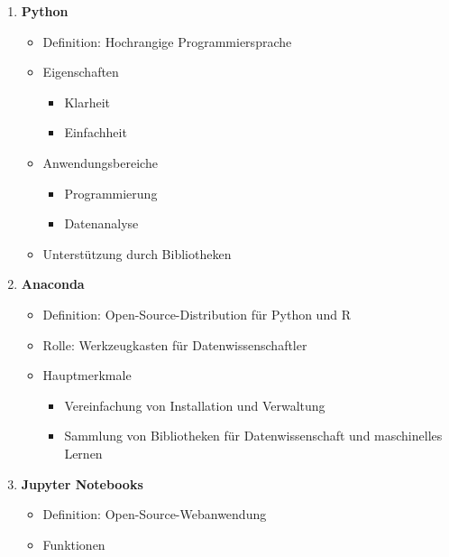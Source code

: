 \documentclass{vorlage-design-main}
\begin{document}
\begin{enumerate}
\def\labelenumi{\arabic{enumi}.}

\item
  \textbf{Python}

  \begin{itemize}

  \item
    Definition: Hochrangige Programmiersprache
  \item
    Eigenschaften

    \begin{itemize}

    \item
      Klarheit
    \item
      Einfachheit
    \end{itemize}
  \item
    Anwendungsbereiche

    \begin{itemize}

    \item
      Programmierung
    \item
      Datenanalyse
    \end{itemize}
  \item
    Unterstützung durch Bibliotheken
  \end{itemize}
\item
  \textbf{Anaconda}

  \begin{itemize}

  \item
    Definition: Open-Source-Distribution für Python und R
  \item
    Rolle: Werkzeugkasten für Datenwissenschaftler
  \item
    Hauptmerkmale

    \begin{itemize}

    \item
      Vereinfachung von Installation und Verwaltung
    \item
      Sammlung von Bibliotheken für Datenwissenschaft und maschinelles
      Lernen
    \end{itemize}
  \end{itemize}
\item
  \textbf{Jupyter Notebooks}

  \begin{itemize}

  \item
    Definition: Open-Source-Webanwendung
  \item
    Funktionen


\end{itemize}
\end{enumerate}
\end{document}
